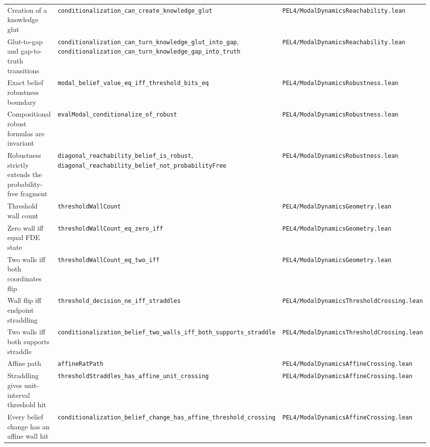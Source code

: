 \begin{longtable}{@{}p{}p{}p{}@{}}
\addlinespace
Creation of a knowledge glut & \texttt{conditionalization\_can\_create\_knowledge\_glut} & \texttt{PEL4/ModalDynamicsReachability.lean}\\
\addlinespace
Glut-to-gap and gap-to-truth transitions & \texttt{conditionalization\_can\_turn\_knowledge\_glut\_into\_gap}, \texttt{conditionalization\_can\_turn\_knowledge\_gap\_into\_truth} & \texttt{PEL4/ModalDynamicsReachability.lean}\\
\addlinespace
Exact belief robustness boundary & \texttt{modal\_belief\_value\_eq\_iff\_threshold\_bits\_eq} & \texttt{PEL4/ModalDynamicsRobustness.lean}\\
\addlinespace
Compositional robust formulas are invariant & \texttt{evalModal\_conditionalize\_of\_robust} & \texttt{PEL4/ModalDynamicsRobustness.lean}\\
\addlinespace
Robustness strictly extends the probability-free fragment & \texttt{diagonal\_reachability\_belief\_is\_robust}, \texttt{diagonal\_reachability\_belief\_not\_probabilityFree} & \texttt{PEL4/ModalDynamicsRobustness.lean}\\
\addlinespace
Threshold wall count & \texttt{thresholdWallCount} & \texttt{PEL4/ModalDynamicsGeometry.lean}\\
\addlinespace
Zero wall iff equal FDE state & \texttt{thresholdWallCount\_eq\_zero\_iff} & \texttt{PEL4/ModalDynamicsGeometry.lean}\\
\addlinespace
Two walls iff both coordinates flip & \texttt{thresholdWallCount\_eq\_two\_iff} & \texttt{PEL4/ModalDynamicsGeometry.lean}\\
\addlinespace
Wall flip iff endpoint straddling & \texttt{threshold\_decision\_ne\_iff\_straddles} & \texttt{PEL4/ModalDynamicsThresholdCrossing.lean}\\
\addlinespace
Two walls iff both supports straddle & \texttt{conditionalization\_belief\_two\_walls\_iff\_both\_supports\_straddle} & \texttt{PEL4/ModalDynamicsThresholdCrossing.lean}\\
\addlinespace
Affine path & \texttt{affineRatPath} & \texttt{PEL4/ModalDynamicsAffineCrossing.lean}\\
\addlinespace
Straddling gives unit-interval threshold hit & \texttt{thresholdStraddles\_has\_affine\_unit\_crossing} & \texttt{PEL4/ModalDynamicsAffineCrossing.lean}\\
\addlinespace
Every belief change has an affine wall hit & \texttt{conditionalization\_belief\_change\_has\_affine\_threshold\_crossing} & \texttt{PEL4/ModalDynamicsAffineCrossing.lean}\\

\end{longtable}
